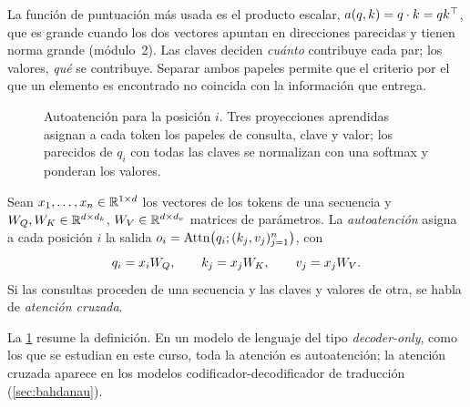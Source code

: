 La función de puntuación más usada es el producto escalar, $a(q,k)=q\cdot k=qk^{\top}$, que es grande cuando los dos vectores apuntan en direcciones parecidas y tienen norma grande (módulo~2). Las claves deciden \emph{cuánto} contribuye cada par; los valores, \emph{qué} se contribuye. Separar ambos papeles permite que el criterio por el que un elemento es encontrado no coincida con la información que entrega.

\begin{figure}[h]
\centering
{}
\caption{Autoatención para la posición $i$. Tres proyecciones aprendidas asignan a cada token los papeles de consulta, clave y valor; los parecidos de $q_i$ con todas las claves se normalizan con una softmax y ponderan los valores.}
\label{fig:qkv}
\end{figure}

\begin{definicion}[Autoatención]\label{def:autoatencion}
Sean $x_1,\dots,x_n\in\mathbb{R}^{1\times d}$ los vectores de los tokens de una secuencia y $W_{Q},W_{K}\in\mathbb{R}^{d\times d_k}$, $W_{V}\in\mathbb{R}^{d\times d_v}$ matrices de parámetros. La \emph{autoatención} asigna a cada posición $i$ la salida $o_i=\operatorname{Attn}\bigl(q_i;(k_j,v_j)_{j=1}^{n}\bigr)$, con
\[
q_i=x_iW_{Q},\qquad k_j=x_jW_{K},\qquad v_j=x_jW_{V} .
\]
Si las consultas proceden de una secuencia y las claves y valores de otra, se habla de \emph{atención cruzada}.
\end{definicion}

\begin{observacion}
La \cref{fig:qkv} resume la definición. En un modelo de lenguaje del tipo \emph{decoder-only}, como los que se estudian en este curso, toda la atención es autoatención; la atención cruzada aparece en los modelos codificador-decodificador de traducción (\cref{sec:bahdanau}).
\end{observacion}

